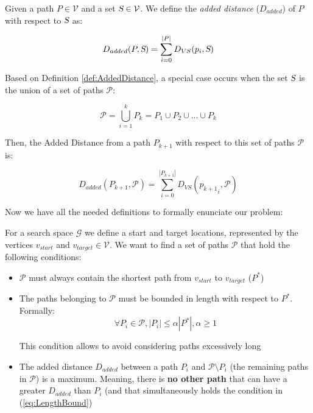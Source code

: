 \documentclass[graybox]{svmult}
\newcommand{\PathSet}{\ensuremath{\mathcal P} }
\newcommand{\Path}{\ensuremath{P} }
\newcommand{\Graph}{\ensuremath{\mathcal G} }
\newcommand{\VertexSet}{\ensuremath{\mathcal V} }
\newcommand{\Set}{\ensuremath{\textsl S} }
\newcommand{\VertexSetDistance}{\ensuremath{D_{VS}} }
\newcommand{\AddedDistance}{\ensuremath{D_{added}} }
\begin{document}
\begin{definition}
\label{def:AddedDistance}
Given a path $\Path \in \VertexSet$ and a set $\Set \in \VertexSet$. We define the \emph{added distance} ($\AddedDistance$) of $\Path$ with respect to $\Set$ as:

\[ \AddedDistance (\Path, \Set) = \sum _{i = 0}^{|\Path|} \VertexSetDistance(p_{i}, \Set) \]

\end{definition}

Based on Definition \ref{def:AddedDistance}, a special case occurs when the set $\Set$ is the union of a set of paths $\PathSet$:

\[ \PathSet = \bigcup_{i = 1}^{k} \Path_{k} = \Path_{1} \cup \Path_{2} \cup ... \cup \Path_{k} \] 

Then, the Added Distance from a path $P_{k+1}$ with respect to this set of paths $\PathSet$ is:

\begin{equation} 
\AddedDistance (\Path_{k+1}, \PathSet) =  \sum _{i = 0}^{|\Path_{k+1}|} \VertexSetDistance({p_{k+1}}_{i}, \PathSet) 
\label{eq:PathDistance}
\end{equation}

Now we have all the needed definitions to formally enunciate our problem:

\begin{definition}
\label{def:DiversePathProblem}
For a search space \Graph we define a start and target locations, represented by the vertices $v_{start}$ and $v_{target} \in \VertexSet$.  We want to find a set of paths $\PathSet$ that hold the following conditions:

\begin{itemize}
\item{$\PathSet$ must always contain the shortest path from $v_{start}$ to $v_{target}$ ($\Path^{*}$)  }
\item{The paths belonging to $\PathSet$ must be bounded in length with respect to $\Path^{*}$. Formally:
\begin{equation} 
\forall \Path_{i} \in \PathSet, \left | \Path_{i} \right | \leq \alpha \left| \Path^{*} \right |, \alpha \geq 1 
\label{eq:LengthBound}
\end{equation}

This condition allows to avoid considering paths excessively long}
\item{The added distance $\AddedDistance$ between a path $\Path_{i}$ and $\PathSet \setminus \Path_{i}$ (the remaining paths in $\PathSet$) is a maximum. Meaning, there is \textbf{no other path} that can have a greater $\AddedDistance$ than $\Path_{i}$ (and that simultaneously holds the condition in (\ref{eq:LengthBound}) }
\end{itemize}
\end{definition}
\end{document}
